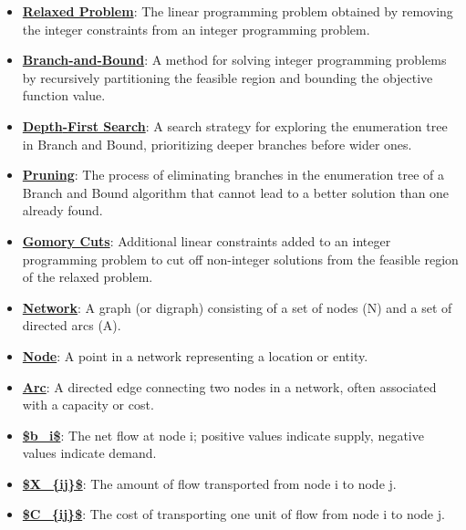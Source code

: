 \documentclass{article}%
\begin{document}
\begin{itemize}[leftmargin=*]
\item \href{https://www.math.purdue.edu/~yipn/421/2024-10-31-IntLinProg.pdf#page=2}{\textbf{Relaxed Problem}}: The linear programming problem obtained by removing the integer constraints from an integer programming problem.%
\item \href{https://www.math.purdue.edu/~yipn/421/2024-10-31-IntLinProg.pdf#page=5}{\textbf{Branch{-}and{-}Bound}}: A method for solving integer programming problems by recursively partitioning the feasible region and bounding the objective function value.%
\item \href{https://www.math.purdue.edu/~yipn/421/2024-10-31-IntLinProg.pdf#page=11}{\textbf{Depth{-}First Search}}: A search strategy for exploring the enumeration tree in Branch and Bound, prioritizing deeper branches before wider ones.%
\item \href{https://www.math.purdue.edu/~yipn/421/2024-10-31-IntLinProg.pdf#page=11}{\textbf{Pruning}}: The process of eliminating branches in the enumeration tree of a Branch and Bound algorithm that cannot lead to a better solution than one already found.%
\item \href{https://www.math.purdue.edu/~yipn/421/2024-10-31-IntLinProg.pdf#page=15}{\textbf{Gomory Cuts}}: Additional linear constraints added to an integer programming problem to cut off non-integer solutions from the feasible region of the relaxed problem.%
\item \href{https://www.math.purdue.edu/~yipn/421/2024-11-05-NetFlows.pdf#page=1}{\textbf{Network}}: A graph (or digraph) consisting of a set of nodes (N) and a set of directed arcs (A).%
\item \href{https://www.math.purdue.edu/~yipn/421/2024-11-05-NetFlows.pdf#page=1}{\textbf{Node}}: A point in a network representing a location or entity.%
\item \href{https://www.math.purdue.edu/~yipn/421/2024-11-05-NetFlows.pdf#page=1}{\textbf{Arc}}: A directed edge connecting two nodes in a network, often associated with a capacity or cost.%
\item \href{https://www.math.purdue.edu/~yipn/421/2024-11-05-NetFlows.pdf#page=2}{\textbf{\$b\_i\$}}: The net flow at node i; positive values indicate supply, negative values indicate demand.%
\item \href{https://www.math.purdue.edu/~yipn/421/2024-11-05-NetFlows.pdf#page=2}{\textbf{\$X\_\{ij\}\$}}: The amount of flow transported from node i to node j.%
\item \href{https://www.math.purdue.edu/~yipn/421/2024-11-05-NetFlows.pdf#page=2}{\textbf{\$C\_\{ij\}\$}}: The cost of transporting one unit of flow from node i to node j.%

\end{itemize}
\end{document}
